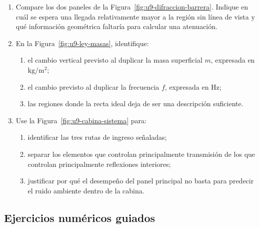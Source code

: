 \begin{enumerate}[label=\textbf{V\arabic*.},leftmargin=*]
    \item Compare los dos paneles de la
    Figura~\ref{fig:u9-difraccion-barrera}. Indique en cuál se espera una
    llegada relativamente mayor a la región sin línea de vista y qué
    información geométrica faltaría para calcular una atenuación.

    \item En la Figura~\ref{fig:u9-ley-masas}, identifique:
    \begin{enumerate}
        \item el cambio vertical previsto al duplicar la masa superficial
        \(m\), expresada en \(\text{kg}/\text{m}^2\);
        \item el cambio previsto al duplicar la frecuencia \(f\), expresada
        en \(\text{Hz}\);
        \item las regiones donde la recta ideal deja de ser una descripción
        suficiente.
    \end{enumerate}

    \item Use la Figura~\ref{fig:u9-cabina-sistema} para:
    \begin{enumerate}
        \item identificar las tres rutas de ingreso señaladas;
        \item separar los elementos que controlan principalmente transmisión
        de los que controlan principalmente reflexiones interiores;
        \item justificar por qué el desempeño del panel principal no basta
        para predecir el ruido ambiente dentro de la cabina.
    \end{enumerate}
\end{enumerate}

\subsection*{Ejercicios numéricos guiados}

